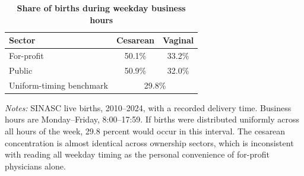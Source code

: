 \begin{table}[H]\centering
\caption{\textbf{Share of births during weekday business hours}}
\label{tab:business_hours}
\small
\begin{tabular}{lcc}
\toprule
Sector & Cesarean & Vaginal \\
\midrule
For-profit & 50.1\% & 33.2\% \\
Public & 50.9\% & 32.0\% \\
\midrule
Uniform-timing benchmark & \multicolumn{2}{c}{29.8\%} \\
\bottomrule
\end{tabular}
\begin{minipage}{\linewidth}\footnotesize
\textit{Notes:} SINASC live births, 2010--2024, with a recorded delivery time. Business hours are Monday--Friday, 8:00--17:59. If births were distributed uniformly across all hours of the week, 29.8 percent would occur in this interval. The cesarean concentration is almost identical across ownership sectors, which is inconsistent with reading all weekday timing as the personal convenience of for-profit physicians alone.
\end{minipage}
\end{table}
